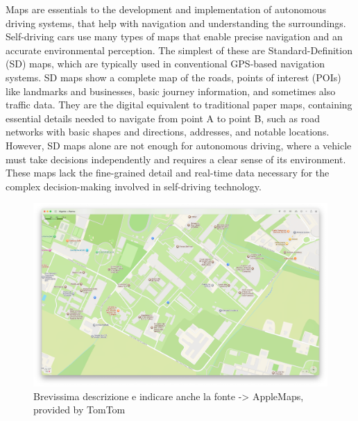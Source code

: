 Maps are essentials to the development and implementation of autonomous driving systems, that help with navigation and understanding the surroundings. Self-driving cars use many types of maps that enable precise navigation and an accurate environmental perception. The simplest of these are Standard-Definition (SD) maps, which are typically used in conventional GPS-based navigation systems. SD maps show a complete map of the roads, points of interest (POIs) like landmarks and businesses, basic journey information, and sometimes also traffic data. They are the digital equivalent to traditional paper maps, containing essential details needed to navigate from point A to point B, such as road networks with basic shapes and directions, addresses, and notable locations.
However, SD maps alone are not enough for autonomous driving, where a vehicle must take decisions independently and requires a clear sense of its environment. 
These maps lack the fine-grained detail and real-time data necessary for the complex decision-making involved in self-driving technology.
\begin{figure}
    \centering
    \includegraphics[width=0.9\linewidth]{LateX//figs/SD_MAP.png}
    \caption{Brevissima descrizione e indicare anche la fonte -> AppleMaps, provided by TomTom}
    \label{fig:enter-label}
\end{figure}

